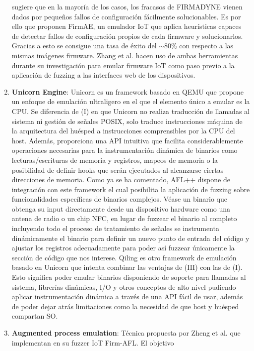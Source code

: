 \begin{enumerate}[I]
    sugiere que en la mayoría de los casos, los fracasos de FIRMADYNE\cite{Chen2016} vienen dados por pequeños fallos de configuración fácilmente 
    solucionables. Es por ello que proponen FirmAE, un emulador IoT que aplica heurísticas capaces de detectar fallos de configuración propios de cada
    firmware y solucionarlos. Gracias a esto se consigue una tasa de éxito del $\sim$80\% con respecto a las mismas imágenes firmware.
    Zhang et al.\cite{Zhang2021} hacen uso de ambas herramientas durante su investigación para emular firmware IoT como paso previo a la aplicación de
    fuzzing a las interfaces web de los dispositivos.
    \item \textbf{Unicorn Engine}: Unicorn\cite{unicorn} es un framework basado en QEMU que propone un enfoque de emulación ultraligero en el que el elemento único a 
    emular es la CPU. Se diferencia de (I) en que Unicorn no realiza traducción de llamadas al sistema ni gestión de señales POSIX, solo traduce instrucciones 
    máquina de la arquitectura del huésped a instrucciones comprensibles por la CPU del host. Además, proporciona una API intuitiva que facilita 
    considerablemente operaciones necesarias para la instrumentación dinámica de binarios como lecturas/escrituras de memoria y registros, mapeos de memoria o 
    la posibilidad de definir hooks que serán ejecutados al alcanzarse ciertas direcciones de memoria. Como ya se ha comentado, AFL++ dispone de integración 
    con este framework el cual posibilita la aplicación de fuzzing sobre funcionalidades específicas de binarios complejos. Véase un binario que obtenga su 
    input directamente desde un dispositivo hardware como una antena de radio o un chip NFC, en lugar de fuzzear el binario al completo incluyendo todo el 
    proceso de tratamiento de señales se instrumenta dinámicamente el binario para definir un nuevo punto de entrada del código y ajustar los registros
    adecuadamente para poder así fuzzear únicamente la sección de código que nos interese. Qiling\cite{qiling} es otro framework de emulación basado en
    Unicorn\cite{unicorn} que intenta combinar las ventajas de (III) con las de (I). Esto significa poder emular binarios disponiendo de soporte 
    para llamadas al sistema, librerías dinámicas, I/O y otros conceptos de alto nivel pudiendo aplicar instrumentación dinámica a través de una API fácil 
    de usar, además de poder dejar atrás limitaciones como la necesidad de que host y huésped compartan SO.
    \item \textbf{Augmented process emulation}: Técnica propuesta por Zheng et al.\cite{Zheng2019} que implementan en su fuzzer IoT Firm-AFL. El objetivo 

\end{enumerate}
